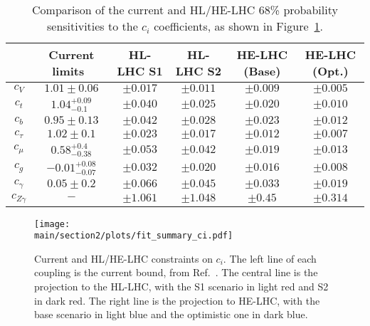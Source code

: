 \begin{table}[ht!]
\begin{center}
\caption{Comparison of the current and HL/HE-LHC 68\% probability sensitivities to the $c_{i}$ coefficients, as shown in Figure~\ref{fig:projection.ci}.}\label{tab:projection.ci}
\begin{tabular}{  c c c c c c }
  \hline\hline
  & Current limits~\cite{deBlas:2018tjm}  & HL-LHC S1 & HL-LHC S2 & HE-LHC (Base)&HE-LHC (Opt.) \\
  \hline
   $c_{V}$&$1.01\pm0.06$ &$\pm 0.017$&$\pm 0.011$&$\pm 0.009$&$\pm 0.005$\\
  $c_{t}$&$1.04^{+0.09}_{-0.1}$&$\pm 0.040$&$\pm 0.025$&$\pm 0.020$&$\pm 0.010$\\
  $c_{b}$&$0.95\pm0.13$ &$\pm 0.042$&$\pm 0.028$&$\pm 0.023$&$\pm 0.012$ \\
  $c_{\tau}$&$1.02\pm 0.1$ &$\pm 0.023$&$\pm 0.017$& $\pm 0.012$&$\pm 0.007$\\
  $c_{\mu}$&$0.58^{+0.4}_{-0.38} $ &$\pm 0.053$&$\pm 0.042$& $\pm 0.019$&$\pm 0.013$\\
  $c_{g}$&$-0.01^{+0.08}_{-0.07} $ &$\pm 0.032$&$\pm 0.020$& $\pm 0.016$&$\pm 0.008$\\
  $c_{\gamma}$ &$0.05\pm0.2 $&$\pm 0.066$&$\pm 0.045$&$\pm 0.033$&$\pm 0.019$\\
  $c_{Z\gamma}$ &$-$&$\pm 1.061$&$\pm 1.048$&$\pm 0.45$&$\pm 0.314$\\
\hline\hline
\end{tabular}
\end{center}
\end{table}
%
\begin{figure}[ht]
\texttt{[image: \\main/section2/plots/fit\_summary\_ci.pdf]}
\caption{Current and HL/HE-LHC constraints on $c_{i}$. The left line of each coupling is the current bound, from Ref.~\cite{deBlas:2018tjm}. The central line is the projection to the HL-LHC, with the S1 scenario in light red and S2 in dark red. The right line is the projection to HE-LHC, with the base scenario in light blue and the optimistic one in dark blue.}\label{fig:projection.ci}
\end{figure}

